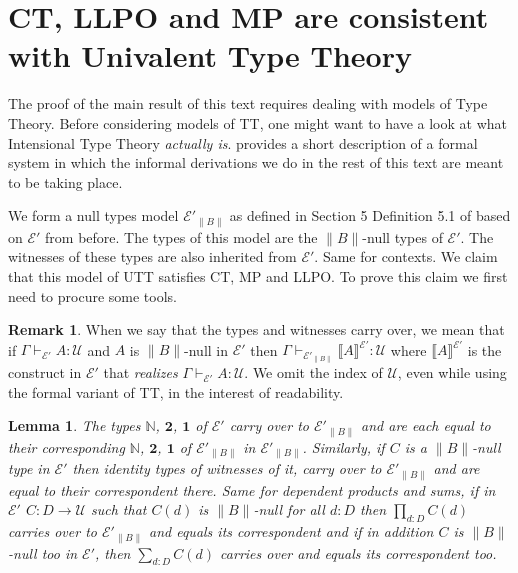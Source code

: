\documentclass[12pt]{report}
\newtheorem{lem}[thm]{Lemma}
\theoremstyle{definition}
\newtheorem{rem}[thm]{Remark}
\begin{document}
\section{CT, LLPO and MP are consistent with Univalent Type Theory}\label{nullTypesModel}
The proof of the main result of this text requires dealing with models of Type Theory. 
Before considering models of TT, one might want to have a look at what Intensional Type Theory \textit{actually is}. 
 provides a short description of a formal system in which the informal derivations we do in the rest of this text are meant to be taking place. 

We form a null types model $\mathcal{E}'_{\lVert B \rVert}$ as defined in Section 5 Definition 5.1 of \cite{1905.03014} based on $\mathcal{E}'$ from before. 
The types of this model are the $\lVert B \rVert $-null types of $\mathcal{E}'$. 
The witnesses of these types are also inherited from $\mathcal{E}'$. 
Same for contexts. 
We claim that this model of UTT satisfies CT, MP and LLPO. 
To prove this claim we first need to procure some tools. 
\begin{rem}
When we say that the types and witnesses carry over, we mean that if $\Gamma \vdash_{\mathcal{E}'} A : \mathcal{U}$ and $A$ is $\lVert B \rVert$-null in $\mathcal{E}'$ then $\Gamma \vdash_{\mathcal{E}'_{\lVert B \rVert}} \llbracket A\rrbracket^{\mathcal{E}'} : \mathcal{U}$ where $\llbracket A\rrbracket^{\mathcal{E}'}$ is the construct in $\mathcal{E}'$ that \textit{realizes} $\Gamma \vdash_{\mathcal{E}'} A : \mathcal{U}$. 
We omit the index of $\mathcal{U}$, even while using the formal variant of TT, in the interest of readability.  
\end{rem}
\begin{lem}\label{wellPurported}
The types $\mathbb{N}$, $\mathbf{2}$, $\mathbf{1}$ of $\mathcal{E}'$ carry over to $\mathcal{E}'_{\lVert B \rVert}$ and are each equal to their corresponding $\mathbb{N}$, $\mathbf{2}$, $\mathbf{1}$ of $\mathcal{E}'_{\lVert B \rVert}$ in $\mathcal{E}'_{\lVert B \rVert}$. 
Similarly, if $C$ is a $\lVert B \rVert$-null type in $\mathcal{E}'$ then identity types of witnesses of it, carry over to $\mathcal{E}'_{\lVert B \rVert}$ and are equal to their correspondent there. 
Same for dependent products and sums, if in $\mathcal{E}'$ $C : D \rightarrow \mathcal{U}$ such that $C(d)$ is $\lVert B \rVert$-null for all $d : D$ then $\prod_{d:D}C(d)$ carries over to $\mathcal{E}'_{\lVert B \rVert}$ and equals its correspondent and if in addition $C$ is $\lVert B \rVert$-null too in $\mathcal{E}'$, then $\sum_{d:D} C(d)$ carries over and equals its correspondent too. 
\end{lem}
\end{document}
